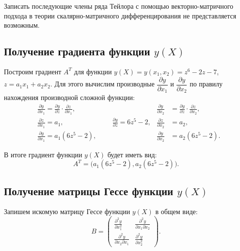Записать последующие члены ряда Тейлора с помощью векторно-матричного подхода в теории
скалярно-матричного дифференцирования не представляется возможным.


\subsection{Получение градиента функции $y(X)$}
\label{subs:gradient}

Построим градиент $A^T$ для функции $y(X) = y(x_1, x_2) = z^6 - 2z - 7$, 
$z = a_1 x_1 + a_2 x_2$. Для этого вычислим производные $\dfrac{\partial y}{\partial x_1}$
и $\dfrac{\partial y}{\partial x_2}$ по правилу нахождения производной сложной функции:
\begin{align*}
  &\frac{\partial y}{\partial x_1} = \frac{\partial y}{\partial z} \cdot \frac{\partial z}{\partial x_1}, 
  &\frac{\partial y}{\partial x_2} &= \frac{\partial y}{\partial z} \cdot \frac{\partial z}{\partial x_2}, \\
  &\frac{\partial z}{\partial x_1} = a_1, \hspace{3cm} \frac{\partial y}{\partial z} = 6z^5 - 2, &\frac{\partial z}{\partial x_2}& = a_2, \\
  &\frac{\partial y}{\partial x_1} = a_1 (6z^5 - 2), &\frac{\partial y}{\partial x_2} &= a_2 (6z^5 - 2).
\end{align*}

В итоге градиент функции $y(X)$ будет иметь вид:
\begin{equation*}
  A^T = \Big( a_1 (6z^5 - 2), a_2 (6z^5 - 2) \Big).
\end{equation*}

\newpage


\subsection{Получение матрицы Гессе функции $y(X)$}

Запишем искомую матрицу Гессе функции $y(X)$ в общем виде:
\[
  B =
    \left(
      \begin{array}{cc}
        \frac{\partial^2 y}{\partial x_1^2} & \frac{\partial^2 y}{\partial x_1 \partial x_2} \\
        \frac{\partial^2 y}{\partial x_2 \partial x_1} & \frac{\partial^2 y}{\partial x_2^2} 
      \end{array}
    \right).
\]

